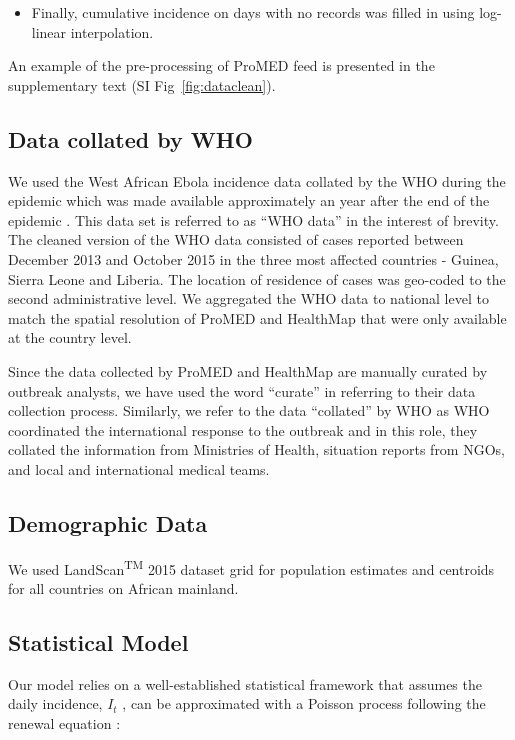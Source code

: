 \documentclass[9pt,twocolumn,twoside,lineno]{pnas-new}
\begin{document}
{\begin{itemize}
\item
  Finally, cumulative incidence on days with no records was filled in
  using log-linear interpolation.
\end{itemize}

An example of the pre-processing of ProMED feed is presented in the
supplementary text (SI Fig~\ref{fig:dataclean}).

\subsection*{Data collated by WHO}\label{data-collated-by-who}

We used the West African Ebola incidence data 
collated by the WHO during the 
epidemic which was made available  
approximately an year after the end of the epidemic
\cite{garske20160308}.
This data set is referred to as ``WHO data'' in the interest of brevity. The cleaned version of the
WHO data consisted of cases reported between December 2013 and October
2015 in the three most affected countries - Guinea, Sierra Leone and
Liberia. The location of residence of cases was geo-coded to the second
administrative level. We aggregated the WHO data to national level to
match the spatial resolution of ProMED and HealthMap that were only
available at the country level. 

Since the data collected by ProMED and
HealthMap are manually curated by outbreak analysts, we have used
the word ``curate'' in referring to their data collection
process. Similarly, we refer to the data ``collated'' by WHO 
as WHO coordinated the international response to the outbreak and in
this role, they collated the information from Ministries of Health,
situation reports from NGOs, and local and international medical teams.

\subsection*{Demographic Data}\label{demographic-data}

We used LandScan\textsuperscript{TM} 2015 dataset grid \cite{landscan}
for population estimates and centroids for all countries on African
mainland.

\subsection*{Statistical Model}\label{statistical-model}

Our model relies on a well-established statistical framework that
assumes the daily incidence, \(I_t\) , can be approximated with a
Poisson process following the renewal equation
\cite{fraser2007estimating}:

}
\end{document}
